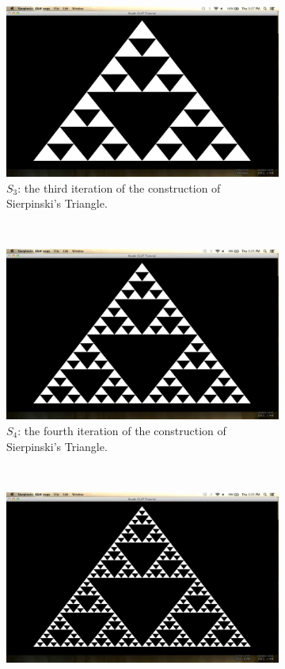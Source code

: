 \documentclass[11pt,oneside,final]{article}
\begin{document}
\begin{figure}[ht]
	\centering
	\begin{subfigure}[b]{0.22\textwidth}
		\includegraphics[width=\textwidth]{sierp3}
		\caption{\(S_3\): the third iteration of the construction of 
		Sierpinski's Triangle.}
		\label{fig:sierptri3}
	\end{subfigure}
	~
	\begin{subfigure}[b]{0.22\textwidth}
		\includegraphics[width=\textwidth]{sierp4}
		\caption{\(S_4\): the fourth iteration of the construction of 
		Sierpinski's Triangle.}
		\label{fig:sierptri3}
	\end{subfigure}
	~
	\begin{subfigure}[b]{0.22\textwidth}
		\includegraphics[width=\textwidth]{sierp5}

\end{subfigure}
\end{figure}
\end{document}
